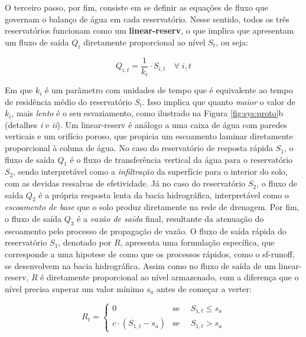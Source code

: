 \documentclass[./main.tex]{subfiles}
\begin{document}
\par O terceiro passo, por fim, consiste em se definir as equações de fluxo que governam o balanço de água em cada reservatório. Nesse sentido, todos os três reservatórios funcionam como um \textbf{\gls{linear-reserv}}, o que implica que apresentam um fluxo de saída $Q_t$ diretamente proporcional ao nível $S_t$, ou seja:
\begin{linenomath*}
\begin{equation} 
	\label{eq:linear_reservoir}
	Q_{i, t} = \frac{1}{k_{i}} \cdot S_{i,t} \quad \forall \;  i, t 
\end{equation}
\end{linenomath*}
Em que $k_i$ é um parâmetro com unidades de tempo que é equivalente ao tempo de residência médio do reservatório $S_i$. Isso implica que quanto \textit{maior} o valor de $k_i$, mais \textit{lento} é o seu esvaziamento, como ilustrado na Figura \ref{fig:sys:proto}b (detalhes \textit{i} e \textit{ii}). Um \gls{linear-reserv} é análogo a uma caixa de água com paredes verticais e um orifício poroso, que propicia um escoamento laminar diretamente proporcional à coluna de água. No caso do reservatório de resposta rápida $S_1$, o fluxo de saída $Q_1$ é o fluxo de transferência vertical da água para o reservatório $S_2$, sendo interpretável como a \textit{infiltração} da superfície para o interior do solo, com as devidas ressalvas de efetividade. Já no caso do reservatório $S_2$, o fluxo de saída $Q_2$ é a própria resposta lenta da bacia hidrográfica, interpretável como o \textit{escoamento de base} que o solo produz diretamente na rede de drenagem. Por fim, o fluxo de saída $Q_3$ é a \textit{vazão de saída} final, resultante da atenuação do escoamento pelo processo de propagação de vazão. O fluxo de saída rápida do reservatório $S_1$, denotado por $R$, apresenta uma formulação específica, que corresponde a uma \gls{hipotese} de como que os processos rápidos, como o \gls{sf-runoff}, se desenvolvem na bacia hidrográfica. Assim como no fluxo de saída de um \gls{linear-reserv}, $R$ é diretamente proporcional ao nível armazenado, com a diferença que o nível precisa superar um valor mínimo $s_a$ antes de começar a verter:
\begin{linenomath*}
\begin{equation} 
	\label{eq:fast_response}
 R_{t} = 
\begin{cases} 
    0 & \text{se } \quad S_{1,t} \leq s_a\\
    c \cdot (S_{1,t} - s_a) & \text{se } \quad S_{1,t} > s_a
\end{cases}
\end{equation}
\end{linenomath*}
\end{document}
